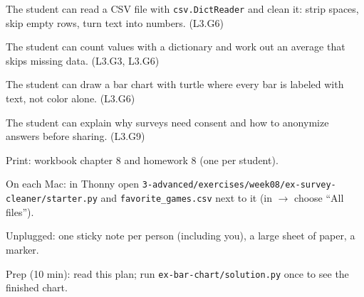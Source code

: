 
\begin{objectives}
  \item The student can read a CSV file with \texttt{csv.DictReader} and clean it: strip spaces, skip empty rows, turn text into numbers. (L3.G6)
  \item The student can count values with a dictionary and work out an average that skips missing data. (L3.G3, L3.G6)
  \item The student can draw a bar chart with turtle where every bar is labeled with text, not color alone. (L3.G6)
  \item The student can explain why surveys need consent and how to anonymize answers before sharing. (L3.G9)
\end{objectives}

\begin{materials}
  \item Print: workbook chapter 8 and homework 8 (one per student).
  \item On each Mac: in Thonny open \texttt{3-advanced/exercises/week08/ex-survey-cleaner/starter.py} and \texttt{favorite\_games.csv} next to it (in  $\rightarrow$  choose \enquote{All files}).
  \item Unplugged: one sticky note per person (including you), a large sheet of paper, a marker.
  \item Prep (10 min): read this plan; run \texttt{ex-bar-chart/solution.py} once to see the finished chart.
\end{materials}

\begin{timeplan}
\end{timeplan}

